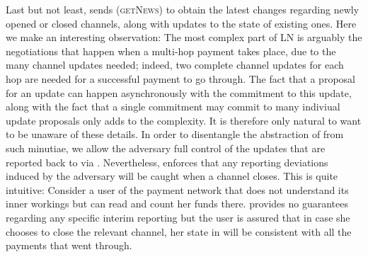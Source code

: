   Last but not least, \environment{} sends (\textsc{getNews}) to obtain the
  latest changes regarding newly opened or closed channels, along with updates
  to the state of existing ones. Here we make an interesting observation: The
  most complex part of LN is arguably the negotiations that happen when a
  multi-hop payment takes place, due to the many channel updates needed; indeed,
  two complete channel updates for each hop are needed for a successful payment
  to go through. The fact that a proposal for an update can happen
  asynchronously with the commitment to this update, along with the fact that a
  single commitment may commit to many indiviual update proposals only adds to
  the complexity. It is therefore only natural to want \fpaynet{} to be unaware
  of these details. In order to disentangle the abstraction of \fpaynet{} from
  such minutiae, we allow the adversary full control of the
  updates that are reported back
  to \environment{} via  \fpaynet{}. 
  Nevertheless, \fpaynet{} enforces that 
  any   reporting deviations induced by the adversary will 
   be caught  when a channel
  closes.  This is quite intuitive: Consider
  a user of the payment network that does not understand its inner workings but
  can read \ledger{} and count her funds there. \fpaynet{} provides no guarantees 
  regarding any specific interim reporting but the user is assured that   in case she chooses to close  the relevant channel,  her state in
  \ledger will be consistent with all the payments that went through.
